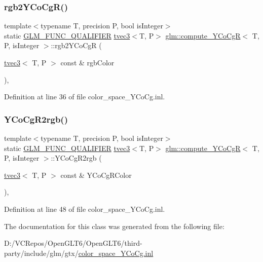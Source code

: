 \subsubsection{\texorpdfstring{rgb2YCoCgR()}{rgb2YCoCgR()}}
{\footnotesize\ttfamily template$<$typename T, precision P, bool is\+Integer$>$ \\
static \mbox{\hyperlink{setup_8hpp_a33fdea6f91c5f834105f7415e2a64407}{G\+L\+M\+\_\+\+F\+U\+N\+C\+\_\+\+Q\+U\+A\+L\+I\+F\+I\+ER}} \mbox{\hyperlink{structglm_1_1tvec3}{tvec3}}$<$T, P$>$ \mbox{\hyperlink{classglm_1_1compute___y_co_cg_r}{glm\+::compute\+\_\+\+Y\+Co\+CgR}}$<$ T, P, is\+Integer $>$\+::rgb2\+Y\+Co\+CgR (\begin{DoxyParamCaption}\item[{\mbox{\hyperlink{structglm_1_1tvec3}{tvec3}}$<$ T, P $>$ const \&}]{rgb\+Color }\end{DoxyParamCaption})\hspace{0.3cm}{\ttfamily [inline]}, {\ttfamily [static]}}



Definition at line 36 of file color\+\_\+space\+\_\+\+Y\+Co\+Cg.\+inl.

\mbox{\label{classglm_1_1compute___y_co_cg_r_a08e033fb9983afcffecc1b20de968715}} 
\subsubsection{\texorpdfstring{YCoCgR2rgb()}{YCoCgR2rgb()}}
{\footnotesize\ttfamily template$<$typename T, precision P, bool is\+Integer$>$ \\
static \mbox{\hyperlink{setup_8hpp_a33fdea6f91c5f834105f7415e2a64407}{G\+L\+M\+\_\+\+F\+U\+N\+C\+\_\+\+Q\+U\+A\+L\+I\+F\+I\+ER}} \mbox{\hyperlink{structglm_1_1tvec3}{tvec3}}$<$T, P$>$ \mbox{\hyperlink{classglm_1_1compute___y_co_cg_r}{glm\+::compute\+\_\+\+Y\+Co\+CgR}}$<$ T, P, is\+Integer $>$\+::Y\+Co\+Cg\+R2rgb (\begin{DoxyParamCaption}\item[{\mbox{\hyperlink{structglm_1_1tvec3}{tvec3}}$<$ T, P $>$ const \&}]{Y\+Co\+Cg\+R\+Color }\end{DoxyParamCaption})\hspace{0.3cm}{\ttfamily [inline]}, {\ttfamily [static]}}



Definition at line 48 of file color\+\_\+space\+\_\+\+Y\+Co\+Cg.\+inl.



The documentation for this class was generated from the following file\+:\begin{DoxyCompactItemize}
\item 
D\+:/\+V\+C\+Repos/\+Open\+G\+L\+T6/\+Open\+G\+L\+T6/third-\/party/include/glm/gtx/\mbox{\hyperlink{color__space___y_co_cg_8inl}{color\+\_\+space\+\_\+\+Y\+Co\+Cg.\+inl}}\end{DoxyCompactItemize}
